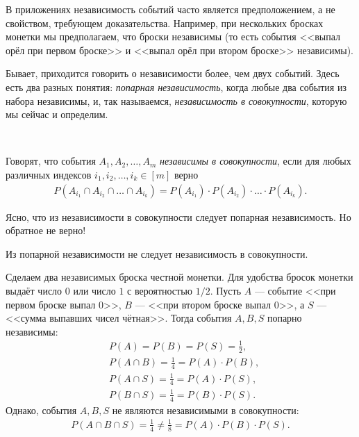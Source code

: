 \documentclass[../main.tex]{subfiles}
\begin{document}
В приложениях независимость событий часто является предположением, а не свойством, требующем доказательства. Например, при нескольких бросках монетки мы предполагаем, что броски независимы (то есть события <<выпал орёл при первом броске>> и <<выпал орёл при втором броске>> независимы).

Бывает, приходится говорить о независимости более, чем двух событий. Здесь есть два разных понятия: \textit{попарная независимость}, когда любые два события из набора независимы, и, так называемся, \textit{независимость в совокупности}, которую мы сейчас и определим.

\begin{df}\

 Говорят, что события $A_1, A_2, \ldots, A_m$ \textit{независимы в совокупности}, если для любых различных индексов $i_1, i_2, \ldots, i_k \in [m]$ верно
 \begin{align*}
  P(A_{i_1} \cap A_{i_2} \cap \ldots \cap A_{i_k}) = P(A_{i_1}) \cdot P(A_{i_2}) \cdot \ldots \cdot P(A_{i_k}).
 \end{align*} 
\end{df}

Ясно, что из независимости в совокупности следует попарная независимость. Но обратное не верно!

\begin{remrk}
 Из попарной независимости не следует независимость в совокупности.
\end{remrk}
\begin{exmpl}
 Сделаем два независимых броска честной монетки. Для удобства бросок монетки выдаёт число $ 0 $ или число $ 1 $ с вероятностью $ 1 / 2 $. Пусть $ A $ --- событие <<при первом броске выпал $ 0 $>>, $ B $ --- <<при втором броске выпал $ 0 $>>, а $ S $ --- <<сумма выпавших чисел чётная>>. Тогда события $ A, B, S $ попарно независимы:
 \begin{align*}
  &P(A) = P(B) = P(S) = \frac{1}{2}, \\
  &P(A \cap B) = \frac{1}{4} = P(A) \cdot P(B), \\
  &P(A \cap S) = \frac{1}{4} = P(A) \cdot P(S), \\
  &P(B \cap S) = \frac{1}{4} = P(B) \cdot P(S).
 \end{align*} Однако, события $ A,B,S $ не являются независимыми в совокупности:
 \begin{align*}
  P(A \cap B \cap S) = \frac{1}{4} \neq \frac{1}{8} = P(A) \cdot P(B) \cdot P(S).
 \end{align*}
\end{exmpl}
\end{document}
